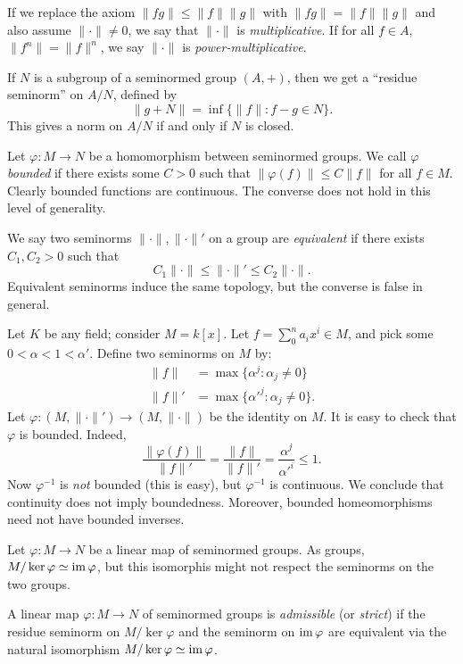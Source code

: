 If we replace the axiom $\|f g\| \leqslant \|f\| \|g\|$ with 
$\|f g\| = \|f\| \|g\|$ and also assume $\|\cdot\|\ne 0$, we say that 
$\|\cdot\|$ is \emph{multiplicative}. If for all $f\in A$, $\|f^n\| = \|f\|^n$, 
we say $\|\cdot\|$ is \emph{power-multiplicative}. 

If $N$ is a subgroup of a seminormed group $(A,+)$, then we get a ``residue 
seminorm'' on $A/N$, defined by 
\[
  \|g+N\| = \inf\{\|f\|\colon f-g\in N\} .
\]
This gives a norm on $A/N$ if and only if $N$ is closed. 

Let $\varphi\colon M\to N$ be a homomorphism between seminormed groups. We call 
$\varphi$ \emph{bounded} if there exists some $C>0$ such that 
$\|\varphi(f)\|\leqslant C \|f\|$ for all $f\in M$. Clearly bounded functions 
are continuous. The converse does not hold in this level of generality. 

We say two seminorms $\|\cdot\|,\|\cdot\|'$ on a group are \emph{equivalent} if 
there exists $C_1,C_2>0$ such that 
\[
  C_1 \|\cdot\| \leqslant \|\cdot\|' \leqslant C_2 \|\cdot\| .
\]
Equivalent seminorms induce the same topology, but the converse is false in 
general. 

\begin{example}
Let $K$ be any field; consider $M=k[x]$. Let $f=\sum_0^n a_i x^i\in M$, and 
pick some $0<\alpha<1<\alpha'$. Define two seminorms on $M$ by:
\begin{align*}
  \|f\| &= \max\{\alpha^j\colon \alpha_j\ne 0\} \\
  \|f\|' &= \max\{{\alpha'}^j\colon \alpha_j\ne 0\} .
\end{align*}
Let $\varphi\colon (M,\|\cdot\|')\to (M,\|\cdot\|)$ be the identity on $M$. It 
is easy to check that $\varphi$ is bounded. Indeed, 
\[
  \frac{\|\varphi(f)\|}{\|f\|'} = \frac{\|f\|}{\|f\|'} = \frac{\alpha^j}{{\alpha'}^i} \leqslant 1 .
\]
Now $\varphi^{-1}$ is \emph{not} bounded (this is easy), but 
$\varphi^{-1}$ is continuous. We conclude that continuity does not imply 
boundedness. Moreover, bounded homeomorphisms need not have bounded inverses. 
\end{example}

Let $\varphi\colon M\to N$ be a linear map of seminormed groups. As groups, 
$M/\ker\varphi\simeq \operatorname{im}\varphi$, but this isomorphis might not respect the 
seminorms on the two groups. 

\begin{definition}
A linear map $\varphi\colon M\to N$ of seminormed groups is \emph{admissible} 
(or \emph{strict}) if the residue seminorm on $M/\ker\varphi$ and the seminorm 
on $\operatorname{im}\varphi$ are equivalent via the natural isomorphism 
$M/\ker\varphi\simeq \operatorname{im}\varphi$. 
\end{definition}

